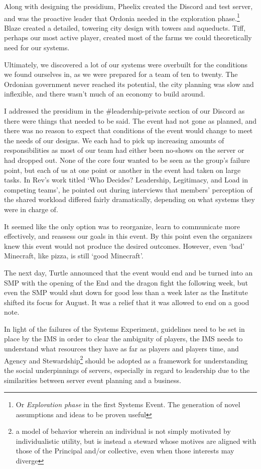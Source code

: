 Along with designing the presidium, Pheelix created the Discord and test server, and was the proactive leader that Ordonia needed in the exploration phase.\footnote{Or \textit{Exploration phase} in the first Systems Event. The generation of novel assumptions and ideas to be proven useful} Blaze created a detailed, towering city design with towers and aqueducts. Tiff, perhaps our most active player, created most of the farms we could theoretically need for our systems.

Ultimately, we discovered a lot of our systems were overbuilt for the conditions we found ourselves in, as we were prepared for a team of ten to twenty. The Ordonian government never reached its potential, the city planning was slow and inflexible, and there wasn't much of an economy to build around.

I addressed the presidium in the \#leadership-private section of our Discord as there were things that needed to be said. The event had not gone as planned, and there was no reason to expect that conditions of the event would change to meet the needs of our designs. We each had to pick up increasing amounts of responsibilities as most of our team had either been no-shows on the server or had dropped out. None of the core four wanted to be seen as the group's failure point, but each of us at one point or another in the event had taken on large tasks. In Rev's work titled `Who Decides? Leadership, Legitimacy, and Load in competing teams', he pointed out during interviews that members' perception of the shared workload differed fairly dramatically, depending on what systems they were in charge of.~\citep{Rev(2026)}

It seemed like the only option was to reorganize, learn to communicate more effectively, and reassess our goals in this event. By this point even the organizers knew this event would not produce the desired outcomes. However, even `bad' Minecraft, like pizza, is still `good Minecraft'.

The next day, Turtle announced that the event would end and be turned into an SMP with the opening of the End and the dragon fight the following week, but even the SMP would shut down for good less than a week later as the Institute shifted its focus for August. It was a relief that it was allowed to end on a good note.

In light of the failures of the Systems Experiment, guidelines need to be set in place by the IMS in order to clear the ambiguity of players, the IMS needs to understand what resources they have as far as players and players time, and Agency and Stewardship\footnote{a model of behavior wherein an individual is not simply motivated by individualistic utility, but is instead a steward whose motives are aligned with those of the Principal and/or collective, even when those interests may diverge} should be adopted as a framework for understanding the social underpinnings of servers, especially in regard to leadership due to the similarities between server event planning and a business.

